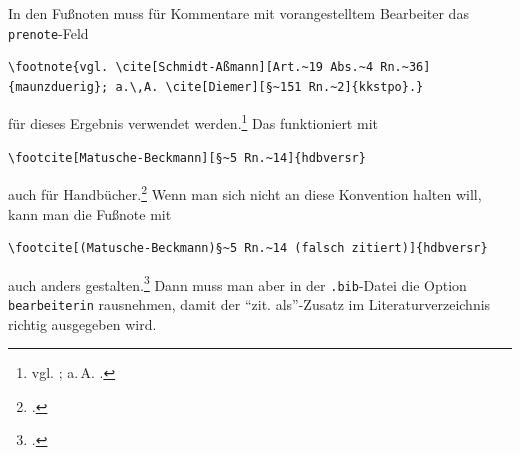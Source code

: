 \documentclass[headings=small,numbers=noenddot, 12pt,oneside]{scrartcl}
\begin{document}
In den Fußnoten muss für Kommentare mit vorangestelltem Bearbeiter das \texttt{prenote}-Feld 
\begin{verbatim}
\footnote{vgl. \cite[Schmidt-Aßmann][Art.~19 Abs.~4 Rn.~36]{maunzduerig}; a.\,A. \cite[Diemer][§~151 Rn.~2]{kkstpo}.}
\end{verbatim}
für dieses Ergebnis verwendet werden.\footnote{vgl. \cite[Schmidt-Aßmann][Art.~19 Abs.~4 Rn.~36]{maunzduerig}; a.\,A. \cite[Diemer][§~151 Rn.~2]{kkstpo}.} Das funktioniert mit 
\begin{verbatim}
\footcite[Matusche-Beckmann][§~5 Rn.~14]{hdbversr}
\end{verbatim}
auch für Handbücher.\footcite[Matusche-Beckmann][§~5 Rn.~14]{hdbversr} Wenn man sich nicht an diese Konvention halten will, kann man die Fußnote mit 
\begin{verbatim}
\footcite[(Matusche-Beckmann)§~5 Rn.~14 (falsch zitiert)]{hdbversr}
\end{verbatim}
auch anders gestalten.\footcite[(Matusche-Beckmann)§~5 Rn.~14 (falsch zitiert)]{hdbversr}
Dann muss man aber in der \texttt{.bib}-Datei die Option \texttt{bearbeiterin} rausnehmen, damit der \enquote{zit. als}-Zusatz im Literaturverzeichnis richtig ausgegeben wird.
\end{document}
